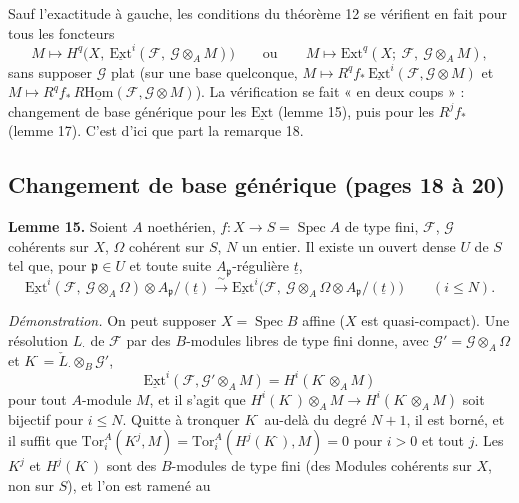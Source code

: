 \documentclass[11pt,a4paper]{article}
\begin{document}
Sauf l'exactitude à gauche, les conditions du théorème 12 se vérifient en fait
pour tous les foncteurs
\[
  M \longmapsto H^{q}\bigl(X,\ \underline{\mathrm{Ext}}^{i}(\mathcal{F},\
  \mathcal{G} \otimes_A M)\bigr)
  \qquad\text{ou}\qquad
  M \longmapsto \mathrm{Ext}^{q}(X;\ \mathcal{F},\ \mathcal{G} \otimes_A M),
\]
sans supposer $\mathcal{G}$ plat (sur une base quelconque, $M \mapsto
R^q f_{*}\,\underline{\mathrm{Ext}}^{i}(\mathcal{F}, \mathcal{G} \otimes M)$
et $M \mapsto R^q f_{*}\,R\underline{\mathrm{Hom}}(\mathcal{F}, \mathcal{G}
\otimes M)$). La vérification se fait « en deux coups » : changement de base
générique pour les $\underline{\mathrm{Ext}}$ (lemme 15), puis pour les $R^j
f_{*}$ (lemme 17). C'est d'ici que part la remarque 18.

\subsection*{Changement de base générique (pages 18 à 20)}

\textbf{Lemme 15.} Soient $A$ noethérien, $f \colon X \to S =
\operatorname{Spec} A$ de type fini, $\mathcal{F}$, $\mathcal{G}$ cohérents sur
$X$, $\Omega$ cohérent sur $S$, $N$ un entier. Il existe un ouvert dense $U$ de
$S$ tel que, pour $\mathfrak{p} \in U$ et toute suite
$A_{\mathfrak{p}}$-régulière $\underline{t}$,
\[
  \underline{\mathrm{Ext}}^{i}(\mathcal{F},\ \mathcal{G} \otimes_A \Omega)
  \otimes A_{\mathfrak{p}}/(\underline{t})
  \xrightarrow{\ \sim\ }
  \underline{\mathrm{Ext}}^{i}\bigl(\mathcal{F},\ \mathcal{G} \otimes_A \Omega
  \otimes A_{\mathfrak{p}}/(\underline{t})\bigr)
  \qquad (i \leq N) .
\]

\emph{Démonstration.} On peut supposer $X = \operatorname{Spec} B$ affine
($X$ est quasi-compact). Une résolution $L_{\cdot}$ de $\mathcal{F}$ par des
$B$-modules libres de type fini donne, avec $\mathcal{G}' = \mathcal{G}
\otimes_A \Omega$ et $K^{\cdot} = \check{L}_{\cdot} \otimes_B \mathcal{G}'$,
\[
  \underline{\mathrm{Ext}}^{i}(\mathcal{F}, \mathcal{G}' \otimes_A M) =
  H^{i}(K^{\cdot} \otimes_A M)
\]
pour tout $A$-module $M$, et il s'agit que $H^{i}(K^{\cdot}) \otimes_A M \to
H^{i}(K^{\cdot} \otimes_A M)$ soit bijectif pour $i \leq N$. Quitte à tronquer
$K^{\cdot}$ au-delà du degré $N+1$, il est borné, et il suffit que
$\mathrm{Tor}_i^A(K^{j}, M) = \mathrm{Tor}_i^A(H^{j}(K^{\cdot}), M) = 0$ pour
$i > 0$ et tout $j$. Les $K^j$ et $H^j(K^{\cdot})$ sont des $B$-modules de type
fini (des Modules cohérents sur $X$, non sur $S$), et l'on est ramené
au
\end{document}
